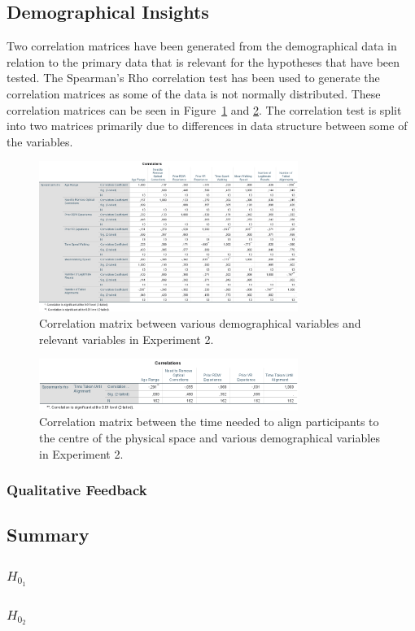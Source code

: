 \subsection{Demographical Insights}


Two correlation matrices have been generated from the demographical data in relation to the primary data that is relevant for the hypotheses that have been tested. The Spearman's Rho correlation test has been used to generate the correlation matrices as some of the data is not normally distributed. These correlation matrices can be seen in Figure~\ref{fig:ex2correlation1} and \ref{fig:ex2correlation2}. The correlation test is split into two matrices primarily due to differences in data structure between some of the variables. 

\begin{figure}[tbph]
    \centering
    \includegraphics[width=0.75\textwidth]{figures/graphs/Ex2Correlations1.png}
    \caption[Demographical Correlation Matrix 1 for Experiment 2]{Correlation matrix between various demographical variables and relevant variables in Experiment 2.}
    \label{fig:ex2correlation1}
\end{figure}

\begin{figure}[tbph]
    \centering
    \includegraphics[width=0.75\textwidth]{figures/graphs/Ex2Correlations2.png}
    \caption[Demographical Correlation Matrix 2 for Experiment 2]{Correlation matrix between the time needed to align participants to the centre of the physical space and various demographical variables in Experiment 2.}
    \label{fig:ex2correlation2}
\end{figure}

\subsubsection{Qualitative Feedback}

\subsection{Summary}
\subsubsection{$H_{0_1}$}
\subsubsection{$H_{0_2}$}